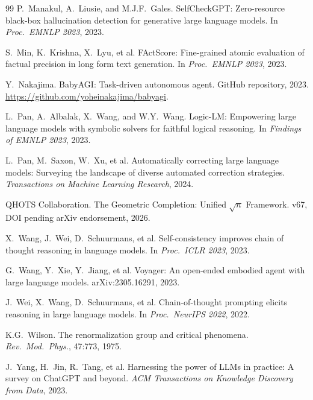 \documentclass[11pt]{article}
\theoremstyle{definition}
\theoremstyle{remark}
\begin{document}
\begin{thebibliography}{99}
  P.~Manakul, A.~Liusie, and M.J.F.~Gales.
  \newblock SelfCheckGPT: Zero-resource black-box hallucination detection for
    generative large language models.
  \newblock In \emph{Proc.\ EMNLP 2023}, 2023.

  S.~Min, K.~Krishna, X.~Lyu, et al.
  \newblock FActScore: Fine-grained atomic evaluation of factual precision in
    long form text generation.
  \newblock In \emph{Proc.\ EMNLP 2023}, 2023.

  Y.~Nakajima.
  \newblock BabyAGI: Task-driven autonomous agent.
  \newblock GitHub repository, 2023.
  \newblock \url{https://github.com/yoheinakajima/babyagi}.

  L.~Pan, A.~Albalak, X.~Wang, and W.Y.~Wang.
  \newblock Logic-LM: Empowering large language models with symbolic solvers for
    faithful logical reasoning.
  \newblock In \emph{Findings of EMNLP 2023}, 2023.

  L.~Pan, M.~Saxon, W.~Xu, et al.
  \newblock Automatically correcting large language models: Surveying the
    landscape of diverse automated correction strategies.
  \newblock \emph{Transactions on Machine Learning Research}, 2024.

  {QHOTS Collaboration}.
  \newblock The Geometric Completion: Unified $\sqrt{n}$ Framework.
  \newblock v67, DOI pending arXiv endorsement, 2026.

  X.~Wang, J.~Wei, D.~Schuurmans, et al.
  \newblock Self-consistency improves chain of thought reasoning in language
    models.
  \newblock In \emph{Proc.\ ICLR 2023}, 2023.

  G.~Wang, Y.~Xie, Y.~Jiang, et al.
  \newblock Voyager: An open-ended embodied agent with large language models.
  \newblock arXiv:2305.16291, 2023.

  J.~Wei, X.~Wang, D.~Schuurmans, et al.
  \newblock Chain-of-thought prompting elicits reasoning in large language models.
  \newblock In \emph{Proc.\ NeurIPS 2022}, 2022.

  K.G.~Wilson.
  \newblock The renormalization group and critical phenomena.
  \newblock \emph{Rev.\ Mod.\ Phys.}, 47:773, 1975.

  J.~Yang, H.~Jin, R.~Tang, et al.
  \newblock Harnessing the power of LLMs in practice: A survey on ChatGPT and
    beyond.
  \newblock \emph{ACM Transactions on Knowledge Discovery from Data}, 2023.

\end{thebibliography}
\end{document}
